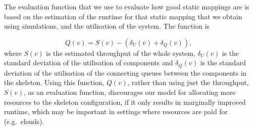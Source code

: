 \documentclass[smallextended]{svjour3}
\begin{document}




The evaluation function that we use to evaluate how good static
mappings are is based on the estimation of the runtime for that static
mapping that we obtain using simulations, and the utilisation of the
system. The function is

$$Q(v) = S(v) - (\delta_U(v) + \delta_Q(v)),$$
where $S(v)$ is the estimated throughput of the whole system,
$\delta_U(v)$ is the standard deviation of the utilisation of
components and $\delta_Q(v)$ is the standard deviation of
the utilisation of the connecting queues between the components in the skeleton. Using this function, $Q(v)$, rather than using
just the throughput, $S(v)$, as an evaluation function, discourages our
model for allocating more resources to the skeleton configuration, if
it only results in marginally improved runtime, which may be important
in settings where resources are paid for (e.g.\ clouds).
\end{document}
